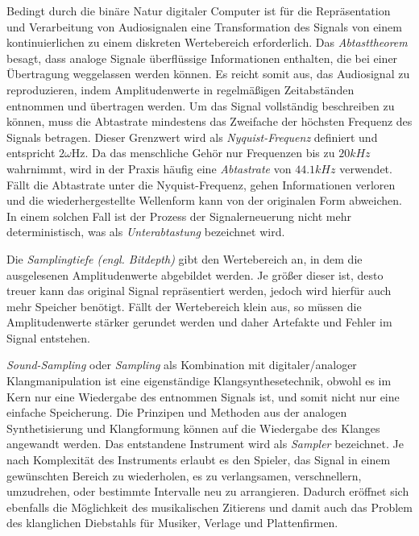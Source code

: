 \documentclass[
  a4paper,  %
  twoside,  %
  bibliography=totoc,
  headsepline,
  cleardoublepage=empty,
  parskip=half,
  draft=false
]{scrbook}
\begin{document}
Bedingt durch die binäre Natur digitaler Computer ist für die Repräsentation und Verarbeitung von Audiosignalen eine Transformation des Signals von einem kontinuierlichen zu einem diskreten Wertebereich erforderlich. Das \emph{Abtasttheorem} besagt, dass analoge Signale überflüssige Informationen enthalten, die bei einer Übertragung weggelassen werden können. Es reicht somit aus, das Audiosignal zu reproduzieren, indem Amplitudenwerte in regelmäßigen Zeitabständen entnommen und übertragen werden. Um das Signal vollständig beschreiben zu können, muss die Abtastrate mindestens das Zweifache der höchsten Frequenz des Signals betragen. Dieser Grenzwert wird als \emph{Nyquist-Frequenz} definiert und entspricht $2 \omega \mathrm{Hz}$. Da das menschliche Gehör nur Frequenzen bis zu $20kHz$ wahrnimmt, wird in der Praxis häufig eine \emph{Abtastrate} von $44.1kHz$ verwendet. Fällt die Abtastrate unter die Nyquist-Frequenz, gehen Informationen verloren und die wiederhergestellte Wellenform kann von der originalen Form abweichen. In einem solchen Fall ist der Prozess der Signalerneuerung nicht mehr deterministisch, was als \emph{Unterabtastung} bezeichnet wird. \cite{lai_practical_2004, shannon_communication_1949, ruschkowski_elektronische_2019}

Die \emph{Samplingtiefe (engl. Bitdepth)} gibt den Wertebereich an, in dem die ausgelesenen Amplitudenwerte abgebildet werden. Je größer dieser ist, desto treuer kann das original Signal repräsentiert werden, jedoch wird hierfür auch mehr Speicher benötigt. Fällt der Wertebereich klein aus, so müssen die Amplitudenwerte stärker gerundet werden und daher Artefakte und Fehler im Signal entstehen. \cite{thompson_understanding_2005}

\emph{Sound-Sampling} oder \emph{Sampling} als Kombination mit digitaler/analoger Klangmanipulation ist eine eigenständige Klangsynthesetechnik, obwohl es im Kern nur eine Wiedergabe des entnommen Signals ist, und somit nicht nur eine einfache Speicherung. Die Prinzipen und Methoden aus der analogen Synthetisierung und Klangformung können auf die Wiedergabe des Klanges angewandt werden. Das entstandene Instrument wird als \emph{Sampler} bezeichnet. Je nach Komplexität des Instruments erlaubt es den Spieler, das Signal in einem gewünschten Bereich zu wiederholen, es zu verlangsamen, verschnellern, umzudrehen, oder bestimmte Intervalle neu zu arrangieren. Dadurch eröffnet sich ebenfalls die Möglichkeit des musikalischen Zitierens und damit auch das Problem des klanglichen Diebstahls für Musiker, Verlage und Plattenfirmen. \cite{russ_sound_2009, ruschkowski_elektronische_2019, katz_capturing_2010} 
\end{document}
